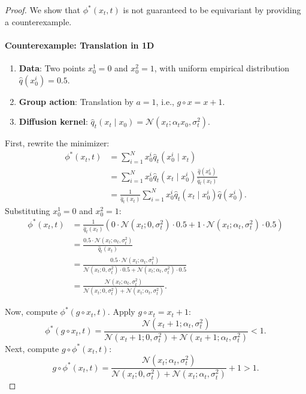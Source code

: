 \begin{proof}
We show that \(\phi^*(x_t, t)\) is not guaranteed to be equivariant by providing a counterexample.

\paragraph{Counterexample: Translation in 1D}


\begin{enumerate}
    \item \textbf{Data}: Two points \(x_0^1 = 0\) and \(x_0^2 = 1\), with uniform empirical distribution \(\hat{q}(x_0^i) = 0.5\).
    \item \textbf{Group action}: Translation by \(a = 1\), i.e., \(g \circ x = x + 1\).
    \item \textbf{Diffusion kernel}: \(\hat{q}_t(x_t \mid x_0) = \mathcal{N}(x_t; \alpha_t x_0, \sigma_t^2)\).
\end{enumerate}

First, rewrite the minimizer:
\begin{align}
    \phi^*(x_t, t) &= \sum_{i=1}^N x_0^i \hat{q}_t(x_0^i \mid x_t) \\
    &= \sum_{i=1}^N x_0^i \hat{q}_t(x_t \mid x_0^i) \frac{\hat{q}(x_0^i)}{\hat{q}_t(x_t)} \\
    &= \frac{1}{\hat{q}_t(x_t)} \sum_{i=1}^N x_0^i \hat{q}_t(x_t \mid x_0^i) \hat{q}(x_0^i) .
\end{align}
Substituting \(x_0^1 = 0\) and \(x_0^2 = 1\):
\begin{align}
    \phi^*(x_t, t) &= \frac{1}{\hat{q}_t(x_t)} \left( 0 \cdot \mathcal{N}(x_t; 0, \sigma_t^2) \cdot 0.5 + 1 \cdot \mathcal{N}(x_t; \alpha_t, \sigma_t^2) \cdot 0.5 \right) \\
    &= \frac{0.5 \cdot \mathcal{N}(x_t; \alpha_t, \sigma_t^2)}{\hat{q}_t(x_t)} \\
    &= \frac{0.5 \cdot \mathcal{N}(x_t; \alpha_t, \sigma_t^2)}{\mathcal{N}(x_t; 0, \sigma_t^2) \cdot 0.5 + \mathcal{N}(x_t; \alpha_t, \sigma_t^2) \cdot 0.5} \\
    &= \frac{\mathcal{N}(x_t; \alpha_t, \sigma_t^2)}{\mathcal{N}(x_t; 0, \sigma_t^2) + \mathcal{N}(x_t; \alpha_t, \sigma_t^2)} .
\end{align}

Now, compute \(\phi^*(g \circ x_t, t)\). Apply \(g \circ x_t = x_t + 1\):
\begin{equation}
    \phi^*(g \circ x_t, t) = \frac{\mathcal{N}(x_t + 1; \alpha_t, \sigma_t^2)}{\mathcal{N}(x_t + 1; 0, \sigma_t^2) + \mathcal{N}(x_t + 1; \alpha_t, \sigma_t^2)} < 1 .
\end{equation}
Next, compute \(g \circ \phi^*(x_t, t)\):
\begin{equation}
    g \circ \phi^*(x_t, t) = \frac{\mathcal{N}(x_t; \alpha_t, \sigma_t^2)}{\mathcal{N}(x_t; 0, \sigma_t^2) + \mathcal{N}(x_t; \alpha_t, \sigma_t^2)} + 1 > 1 .
\end{equation}


\end{proof}
